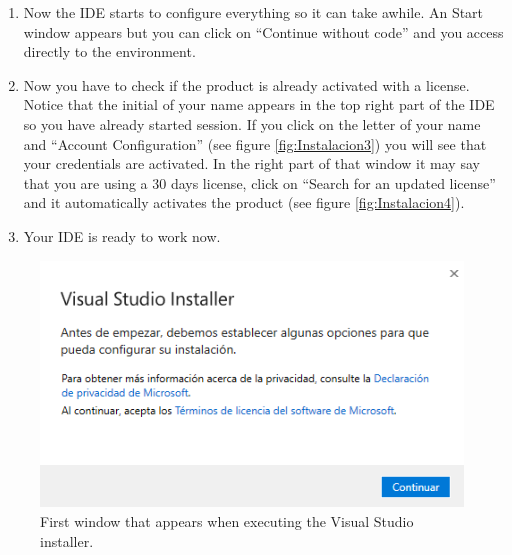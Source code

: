 \begin{enumerate}
    \item Now the IDE starts to configure everything so it can take awhile. An Start window appears but you can click on ``Continue without code'' and you access directly to the environment.
    
    \item Now you have to check if the product is already activated with a license. Notice that the initial of your name appears in the top right part of the IDE so you have already started session. If you click on the letter of your name and ``Account Configuration'' (see figure \ref{fig:Instalacion3}) you will see that your credentials are activated. In the right part of that window it may say that you are using a 30 days license, click on ``Search for an updated license'' and it automatically activates the product (see figure \ref{fig:Instalacion4}).
    
    \item Your IDE is ready to work now. 
    
\end{enumerate}

\begin{figure}
    \centering
    \includegraphics[width=  \textwidth]{Figures/Instalacion-1}
    \caption{First window that appears when executing the Visual Studio installer.}
    \label{fig:Instalacion-1}
\end{figure}

